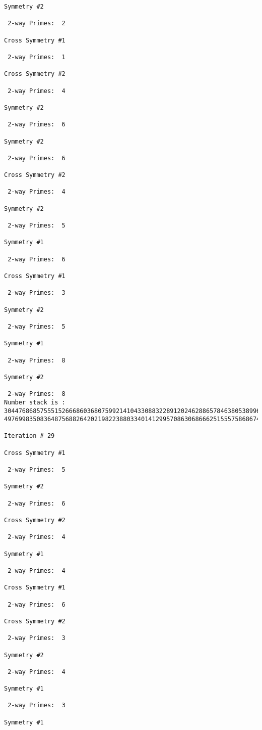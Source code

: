 {{{{\begin{verbatim}
Symmetry #2

 2-way Primes: 	2

Cross Symmetry #1

 2-way Primes: 	1

Cross Symmetry #2

 2-way Primes: 	4

Symmetry #2

 2-way Primes: 	6

Symmetry #2

 2-way Primes: 	6

Cross Symmetry #2

 2-way Primes: 	4

Symmetry #2

 2-way Primes: 	5

Symmetry #1

 2-way Primes: 	6

Cross Symmetry #1

 2-way Primes: 	3

Symmetry #2

 2-way Primes: 	5

Symmetry #1

 2-way Primes: 	8

Symmetry #2

 2-way Primes: 	8
Number stack is :
30447686857555152666860368075992141043308832289120246288657846380538996794608835958544046240163340857
49769983508364875688264202198223880334014129957086306866625155575868674403758043361042640445859538806

Iteration #	29

Cross Symmetry #1

 2-way Primes: 	5

Symmetry #2

 2-way Primes: 	6

Cross Symmetry #2

 2-way Primes: 	4

Symmetry #1

 2-way Primes: 	4

Cross Symmetry #1

 2-way Primes: 	6

Cross Symmetry #2

 2-way Primes: 	3

Symmetry #2

 2-way Primes: 	4

Symmetry #1

 2-way Primes: 	3

Symmetry #1


\end{verbatim}}}}}
